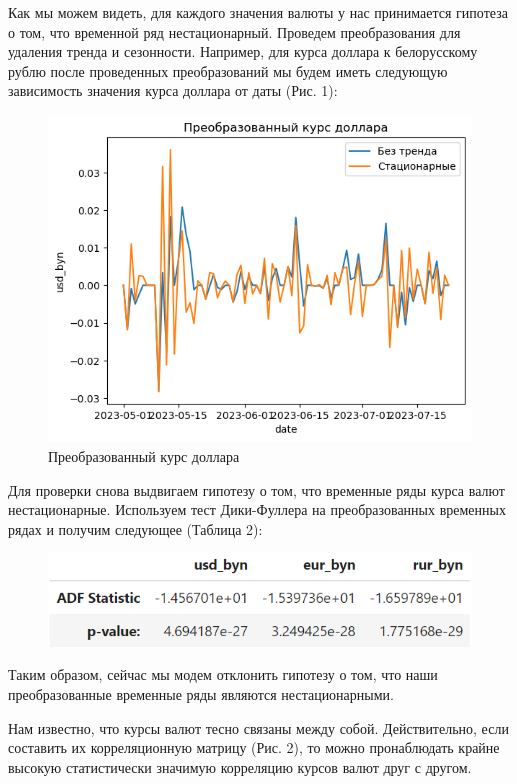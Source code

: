 \documentclass[a4paper, 12pt]{extarticle}
\begin{document}
	Как мы можем видеть, для каждого значения валюты у нас принимается гипотеза о том, что временной ряд нестационарный. Проведем преобразования для удаления тренда и сезонности. Например, для курса доллара к белорусскому рублю после проведенных преобразований мы будем иметь следующую зависимость значения курса доллара от даты (Рис. 1):
	
	\begin{figure}[h!]
		\centering
		\includegraphics[scale=1.0]{images/pic_01}
		\caption[Рис. 1]{Преобразованный курс доллара}
		\label{fig:pic01}
	\end{figure}
	
	Для проверки снова выдвигаем гипотезу о том, что временные ряды курса валют нестационарные. Используем тест Дики-Фуллера на преобразованных временных рядах и получим следующее (Таблица 2):
	
	\begin{figure}[h!]
		\centering
		\label{fig:tab2}
		\includegraphics[scale=1.3]{images/tab_2}
	\end{figure}
	
	Таким образом, сейчас мы модем отклонить гипотезу о том, что наши преобразованные временные ряды являются нестационарными.
	
	Нам известно, что курсы валют тесно связаны между собой. Действительно, если составить их корреляционную матрицу (Рис. 2), то можно пронаблюдать крайне высокую статистически значимую корреляцию курсов валют друг с другом.
	
\end{document}
